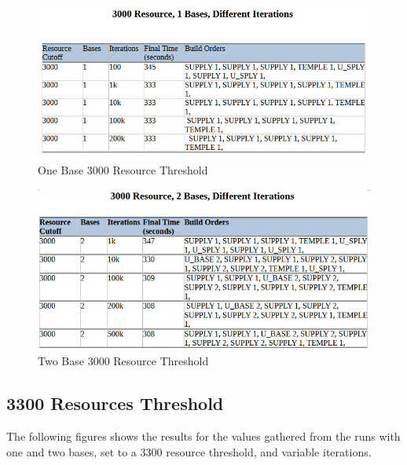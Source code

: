 \documentclass[a4paper, 12pt, english]{article}
\begin{document}
 \begin{figure}[!ht]
 			\begin{center}
				\includegraphics[width=150mm,scale=1.0]{3000r1b.png}
			\end{center}
       		\caption{\label{fig:Lowpass}One Base 3000 Resource Threshold}
 \end{figure}


 \begin{figure}[!ht]
 			\begin{center}
				\includegraphics[width=150mm,scale=1.0]{3000r2b.png}
			\end{center}
       		\caption{\label{fig:Lowpass}Two Base 3000 Resource Threshold}
 \end{figure}


\newpage
\subsection{3300 Resources Threshold}

The following figures shows the results for the values gathered from the runs with one and two bases, set to a 3300 resource threshold, and variable iterations.
\end{document}
